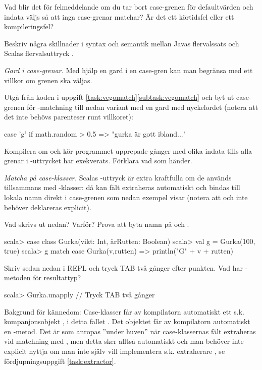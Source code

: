 \Subtask Vad blir det för felmeddelande om du tar bort case-grenen för defaultvärden och indata väljs så att inga case-grenar matchar? Är det ett körtidsfel eller ett kompileringsfel?


\Subtask\Pen Beskriv några skillnader i syntax och semantik mellan Javas flervalssats  och Scalas flervalsuttryck .




\Task \emph{Gard i case-grenar.} Med hjälp en gard  i en case-gren kan man begränsa med ett villkor om grenen ska väljas. 

Utgå från koden i uppgift \ref{task:vegomatch}\ref{subtask:vegomatch} och byt ut case-grenen för -matchning till nedan variant med en gard med nyckelordet  (notera att det inte behövs parenteser runt villkoret):
\begin{Code}
    case 'g' if math.random > 0.5 => "gurka är gott ibland..."
\end{Code}
Kompilera om och kör programmet upprepade gånger med olika indata tills alla grenar i -uttrycket har exekverats. Förklara vad som händer.

\Task \label{task:match-caseclass} \emph{Matcha på case-klasser.} Scalas -uttryck är extra kraftfulla om de används tillsammans med -klasser: då kan fält extraheras automatiskt och bindas till lokala namn direkt i case-grenen som nedan exempel visar (notera att  och  inte behöver deklareras explicit).   

\Subtask Vad skrivs ut nedan? Varför? Prova att byta namn på  och .
\begin{REPL}
scala> case class Gurka(vikt: Int, ärRutten: Boolean)
scala> val g = Gurka(100, true)
scala> g match { case Gurka(v,rutten) => println("G" + v + rutten) }
\end{REPL}

\Subtask Skriv sedan nedan i REPL och tryck TAB två gånger efter punkten. Vad har -metoden för resultattyp?  
\begin{REPL}
scala> Gurka.unapply   // Tryck TAB två gånger
\end{REPL}
Bakgrund för kännedom: Case-klasser får av kompilatorn automatiskt ett s.k. kompanjonsobjekt , i detta fallet . Det objektet får av kompilatorn automatiskt en -metod. Det är  som anropas ''under huven'' när case-klassernas fält extraheras vid matchning med , men detta sker alltså automatiskt och man behöver inte explicit nyttja  om man inte själv vill implementera s.k. extraherare , se fördjupningsuppgift \ref{task:extractor}. 

